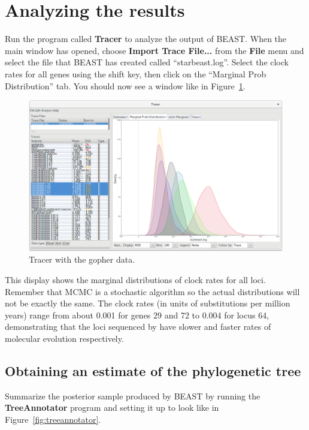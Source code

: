 \documentclass{article}
\begin{document}
\section{Analyzing the results}

Run the program called \textbf{Tracer} to analyze the output of BEAST. When the
main window has opened, choose \textbf{Import Trace File...} from the
\textbf{File} menu and select the file that BEAST has created called
``starbeast.log''. Select the clock rates for all genes using the shift key,
then click on the ``Marginal Prob Distribution'' tab.
You should now see a window like in Figure~\ref{fig:tracer}.

\begin{figure}[htb!]
\centering
\includegraphics[width=\textwidth]{figures/tracer-clock-rates.png}
\caption{Tracer with the gopher data.}
\label{fig:tracer}
\end{figure}

This display shows the marginal distributions of clock rates for all loci.
Remember that MCMC is a stochastic algorithm so the actual distributions will
not be exactly the same. The clock rates (in units of substitutions per million years) range from about 0.001 for genes 29
and 72 to 0.004 for locus 64, demonstrating that the loci sequenced by
\cite{Belfiore01042008} have slower and faster rates of molecular evolution
respectively.

\clearpage

\subsection*{Obtaining an estimate of the phylogenetic tree}

Summarize the posterior sample produced by BEAST by running the
\textbf{TreeAnnotator} program and setting it up to look like in
Figure~\ref{fig:treeannotator}.
\end{document}
